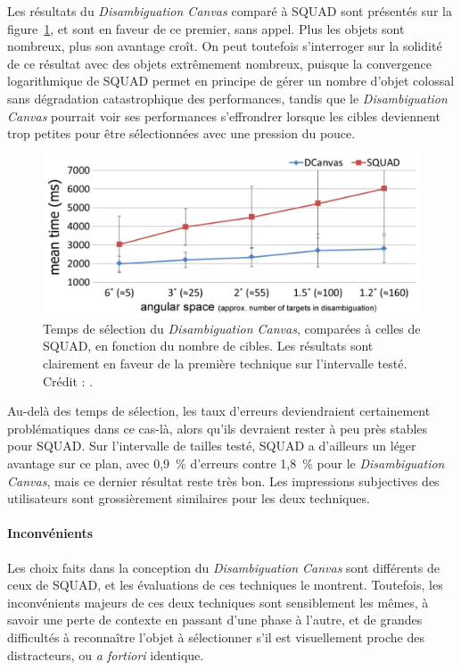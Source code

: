 	Les résultats du \emph{Disambiguation Canvas} comparé à SQUAD sont présentés sur la figure~\ref{fig:dCanvasSPerf}, et sont en faveur de ce premier, sans appel. Plus les objets sont nombreux, plus son avantage croît. On peut toutefois s'interroger sur la solidité de ce résultat avec des objets extrêmement nombreux, puisque la convergence logarithmique de SQUAD permet en principe de gérer un nombre d'objet colossal sans dégradation catastrophique des performances, tandis que le \emph{Disambiguation Canvas} pourrait voir ses performances s'effrondrer lorsque les cibles deviennent trop petites pour être sélectionnées avec une pression du pouce.	
	
	\begin{figure}[H]
		\centering
		\includegraphics[width=\textwidth]{figures/ch2/dCanvasSPerf}
		\caption[\emph{Disambiguation Canvas} --- Performances II]{Temps de sélection du \emph{Disambiguation Canvas}, comparées à celles de SQUAD, en fonction du nombre de cibles. Les résultats sont clairement en faveur de la première technique sur l'intervalle testé. Crédit : \cite{debarba2013disambiguation}.}
		\label{fig:dCanvasSPerf}
	\end{figure}
	
	Au-delà des temps de sélection, les taux d'erreurs deviendraient certainement problématiques dans ce cas-là, alors qu'ils devraient rester à peu près stables pour SQUAD. Sur l'intervalle de tailles testé, SQUAD a d'ailleurs un léger avantage sur ce plan, avec 0,9~\%{} d'erreurs contre 1,8~\%{} pour le \emph{Disambiguation Canvas}, mais ce dernier résultat reste très bon. Les impressions subjectives des utilisateurs sont grossièrement similaires pour les deux techniques.
		 
	\paragraph{Inconvénients}
	Les choix faits dans la conception du \emph{Disambiguation Canvas} sont différents de ceux de SQUAD, et les évaluations de ces techniques le montrent. Toutefois, les inconvénients majeurs de ces deux techniques sont sensiblement les mêmes, à savoir une perte de contexte en passant d'une phase à l'autre, et de grandes difficultés à reconnaître l'objet à sélectionner s'il est visuellement proche des distracteurs, ou \emph{a fortiori} identique.
	
